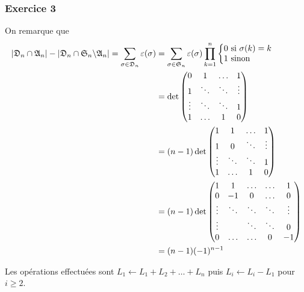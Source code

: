 \documentclass{article}
\begin{document}
\subsubsection*{Exercice 3}
On remarque que
\begin{align*}
|\frak{D}_n\cap\frak{A}_n|-|\frak{D}_n\cap \frak{S}_n\backslash\frak{A}_n| = \sum_{\sigma\in\frak{D}_n}\varepsilon(\sigma) &= \sum_{\sigma\in\frak{S}_n}{\varepsilon(\sigma)\prod_{k=1}^{n} \left\{
     \begin{array}{@{}l@{\thinspace}l}
  0 \textup{ si } \sigma(k)=k\\
  1\textup{ sinon }
     \end{array}
   \right.   }\\
   &=\det \begin{pmatrix}0 & 1 & \ldots & 1\\
   1 & \ddots & \ddots  & \vdots \\
	\vdots & \ddots & \ddots & 1 \\
	1 & \ldots & 1 & 0    
   \end{pmatrix}\\
   &= (n-1)\det\begin{pmatrix} 1 & 1 & \ldots & 1\\
   1 & 0 & \ddots  & \vdots \\
	\vdots & \ddots & \ddots & 1 \\
	1 & \ldots & 1 & 0   
   \end{pmatrix}\\
   &=(n-1)\det \begin{pmatrix}
    1 & 1 & \ldots & \ldots & 1\\
   0 & -1 & 0 &\ldots  & 0 \\
	\vdots & \ddots & \ddots & \ddots &\vdots \\
	\vdots & &\ddots &\ddots  & 0\\
	0 & \ldots&\ldots & 0 & -1   
   \end{pmatrix}\\
   &=(n-1)(-1)^{n-1}
\end{align*}

Les opérations effectuées sont $L_1\leftarrow L_1+L_2+\ldots +L_n$ puis $L_i\leftarrow L_i-L_1$ pour $i\geq 2$.
\end{document}
